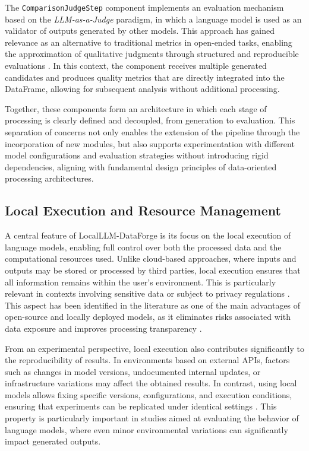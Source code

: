 \documentclass[pdflatex,sn-mathphys-num]{sn-jnl}%
\theoremstyle{thmstyleone}%
\theoremstyle{thmstyletwo}%
\theoremstyle{thmstylethree}%
\begin{document}
The \texttt{ComparisonJudgeStep} component implements an evaluation mechanism based on the \textit{LLM-as-a-Judge} paradigm, in which a language model is used as an validator of outputs generated by other models. This approach has gained relevance as an alternative to traditional metrics in open-ended tasks, enabling the approximation of qualitative judgments through structured and reproducible evaluations \cite{llm_judge_survey}. In this context, the component receives multiple generated candidates and produces quality metrics that are directly integrated into the DataFrame, allowing for subsequent analysis without additional processing.

Together, these components form an architecture in which each stage of processing is clearly defined and decoupled, from generation to evaluation. This separation of concerns not only enables the extension of the pipeline through the incorporation of new modules, but also supports experimentation with different model configurations and evaluation strategies without introducing rigid dependencies, aligning with fundamental design principles of data-oriented processing architectures.

\subsection{Local Execution and Resource Management}

A central feature of LocalLLM-DataForge is its focus on the local execution of language models, enabling full control over both the processed data and the computational resources used. Unlike cloud-based approaches, where inputs and outputs may be stored or processed by third parties, local execution ensures that all information remains within the user’s environment. This is particularly relevant in contexts involving sensitive data or subject to privacy regulations \cite{local_llm_privacy}. This aspect has been identified in the literature as one of the main advantages of open-source and locally deployed models, as it eliminates risks associated with data exposure and improves processing transparency \cite{local_llm_reproducibility}.

From an experimental perspective, local execution also contributes significantly to the reproducibility of results. In environments based on external APIs, factors such as changes in model versions, undocumented internal updates, or infrastructure variations may affect the obtained results. In contrast, using local models allows fixing specific versions, configurations, and execution conditions, ensuring that experiments can be replicated under identical settings \cite{local_llm_reproducibility}. This property is particularly important in studies aimed at evaluating the behavior of language models, where even minor environmental variations can significantly impact generated outputs.
\end{document}
